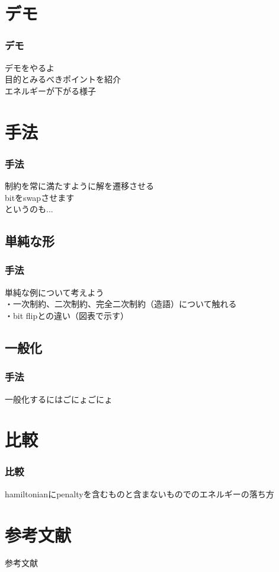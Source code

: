 \section{デモ}
\begin{frame}
  \frametitle{デモ}
  デモをやるよ\\
  目的とみるべきポイントを紹介\\
  エネルギーが下がる様子\\
\end{frame}

\section{手法}
\begin{frame}
  \frametitle{手法}
  {\Large 制約を常に満たすように解を遷移させる}\\
  bitをswapさせます\\
  というのも...
\end{frame}

\subsection{単純な形}
\begin{frame}
  \frametitle{手法}
  単純な例について考えよう\\
  ・一次制約、二次制約、完全二次制約（造語）について触れる\\
  ・bit flipとの違い（図表で示す）
\end{frame}

\subsection{一般化}
\begin{frame}
  \frametitle{手法}
  一般化するにはごにょごにょ
\end{frame}

\section{比較}
\begin{frame}
  \frametitle{比較}
  hamiltonianにpenaltyを含むものと含まないものでのエネルギーの落ち方\\

\end{frame}


\section{参考文献}
\begin{frame}[t]{参考文献}
  \footnotesize

  
  
\end{frame}



